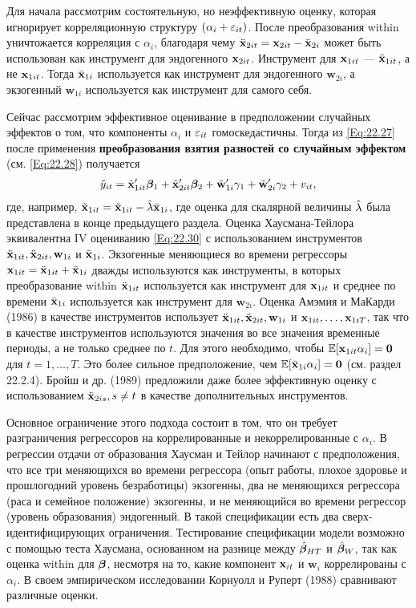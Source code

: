 Для начала рассмотрим состоятельную, но неэффективную оценку, которая игнорирует корреляционную структуру $(\alpha_i+\varepsilon_{it})$. После преобразования within уничтожается корреляция с $\alpha_i$, благодаря чему $\ddot{\mathbf{x}}_{2it}=\mathbf{x}_{2it}-\bar{\mathbf{x}}_{2i}$ может быть использован как инструмент для эндогенного $\mathbf{x}_{2it}$. Инструмент для $\mathbf{x}_{1it}$ --- $\ddot{\mathbf{x}}_{1it}$, а не $\mathbf{x}_{1it}$. Тогда $\bar{\mathbf{x}}_{1i}$ используется как инструмент для эндогенного $\mathbf w_{2i}$, а экзогенный $\mathbf w_{1i}$ используется как инструмент для самого себя.

Сейчас рассмотрим эффективное оценивание в предположении случайных эффектов о том, что компоненты $\alpha_i$ и $\varepsilon_{it}$ гомоскедастичны. Тогда из \ref{Eq:22.27} после применения \textbf{преобразования взятия разностей со случайным эффектом} (см. \ref{Eq:22.28}) получается
\begin{align}
\tilde{y}_{it}=\tilde{\mathbf{x}}'_{1it}\bm{\beta}_1+\tilde{\mathbf{x}}'_{2it}\bm{\beta}_2 + \tilde{\mathbf w}'_{1i}\gamma_1+ \tilde{\mathbf w}'_{2i} \gamma_2  + v_{it},
\label{Eq:22.30}
\end{align}
где, например, $\tilde{\mathbf{x}}_{1it}=\tilde{\mathbf{x}}_{1it}-\hat{\lambda}\bar{\mathbf{x}}_{1i}$, где оценка для скалярной величины $\hat{\lambda}$  была представлена в конце предыдущего раздела. Оценка Хаусмана-Тейлора эквивалентна IV оцениванию \ref{Eq:22.30}  с использованием инструментов $\ddot{\mathbf{x}}_{1it}, \ddot{\mathbf{x}}_{2it}, \mathbf w_{1i}$ и $\bar{\mathbf{x}}_{1i}$. Экзогенные меняющиеся во времени регрессоры $\mathbf{x}_{1it}=\ddot{\mathbf{x}}_{1it}+\bar{\mathbf{x}}_{1i}$ дважды используются как инструменты, в которых преобразование within $\ddot{\mathbf{x}}_{1it}$ используется как инструмент для $\mathbf{x}_{1it}$ и среднее по времени $\bar{\mathbf{x}}_{1i}$ используется как инструмент для $\mathbf w_{2i}$. Оценка Амэмия и МаКарди (1986) в качестве инструментов использует $\ddot {\mathbf{x}}_{1it}, \ddot {\mathbf{x}}_{2it}, \mathbf w_{1i}$ и $\mathbf{x}_{1it}, \dots, \mathbf{x}_{1iT}$, так что в качестве инструментов используются значения во все значения временные периоды, а не только среднее по $t$. Для этого необходимо, чтобы  $\mathbb{E}[\mathbf{x}_{1it} \alpha_i] = \mathbf 0$ для $t=1, \dots, T$. Это более сильное предположение, чем  $\mathbb{E}[\bar{\mathbf{x}}_{1i} \alpha_i]=\mathbf 0$ (см. раздел 22.2.4). Бройш и др. (1989) предложили даже более эффективную оценку с использованием $\ddot{\mathbf{x}}_{2is}, s \neq t$ в качестве дополнительных инструментов.

Основное ограничение этого подхода состоит в том, что он требует разграничения регрессоров на коррелированные и некоррелированные с $\alpha_i$. В регрессии отдачи от образования Хаусман и Тейлор начинают с предположения, что все три меняющихся во времени регрессора (опыт работы, плохое здоровье и прошлогодний уровень безработицы) экзогенны, два не меняющихся регрессора (раса и семейное положение) экзогенны, и не меняющийся во времени регрессор (уровень образования) эндогенный. В такой спецификации есть два сверх-идентифицирующих ограничения. Тестирование спецификации модели возможно с помощью теста Хаусмана, основанном на разнице между $\hat{\bm{\beta}}_{HT}$ и $\hat{\bm{\beta}}_W$, так как оценка within для $\bm{\beta}$, несмотря на то, какие компонент $\mathbf{x}_{it}$ и $\mathbf w_i$ коррелированы с $\alpha_i$. В своем эмпирическом исследовании Корнуолл и Руперт (1988) сравнивают различные оценки.

